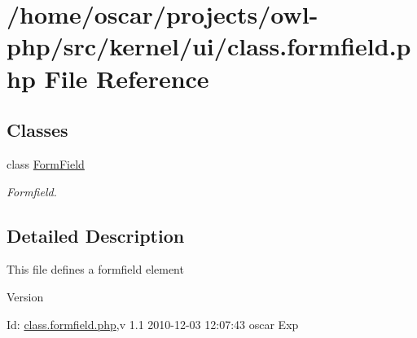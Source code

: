 \section{/home/oscar/projects/owl-\/php/src/kernel/ui/class.formfield.php File Reference}
\label{class_8formfield_8php}
\subsection*{Classes}
\begin{DoxyCompactItemize}
\item 
class \hyperlink{classFormField}{FormField}
\begin{DoxyCompactList}\small\item\em Formfield. \item\end{DoxyCompactList}\end{DoxyCompactItemize}


\subsection{Detailed Description}
This file defines a formfield element \begin{DoxyVersion}{Version}

\end{DoxyVersion}
\begin{DoxyParagraph}{Id:}
\hyperlink{class_8formfield_8php}{class.formfield.php},v 1.1 2010-\/12-\/03 12:07:43 oscar Exp 
\end{DoxyParagraph}
